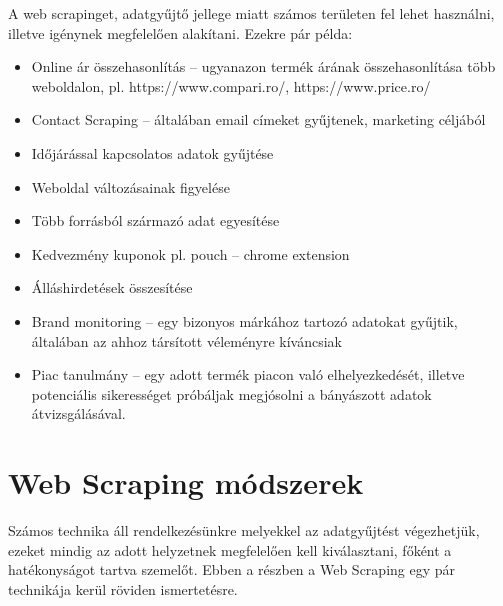A web scrapinget, adatgyűjtő jellege miatt számos területen fel lehet használni, illetve igénynek megfelelően alakítani. Ezekre pár példa:

\begin{itemize}
    \item Online ár összehasonlítás – ugyanazon termék árának összehasonlítása több weboldalon, pl. https://www.compari.ro/, https://www.price.ro/ 
	\item Contact Scraping – általában email címeket gyűjtenek, marketing céljából
    \item Időjárással kapcsolatos adatok gyűjtése
    \item Weboldal változásainak figyelése
	\item Több forrásból származó adat egyesítése
	\item Kedvezmény kuponok pl. pouch – chrome extension
	\item Álláshirdetések összesítése
	\item Brand monitoring – egy bizonyos márkához tartozó adatokat gyűjtik, általában az ahhoz társított véleményre kíváncsiak
    \item Piac tanulmány – egy adott termék piacon való elhelyezkedését, illetve potenciális sikerességet próbáljak megjósolni a bányászott adatok átvizsgálásával.
\end{itemize}

\section{Web Scraping módszerek}
Számos technika áll rendelkezésünkre melyekkel az adatgyűjtést végezhetjük, ezeket mindig az adott helyzetnek megfelelően kell kiválasztani, főként a hatékonyságot tartva szemelőt. Ebben a részben a Web Scraping egy pár technikája kerül röviden ismertetésre.

